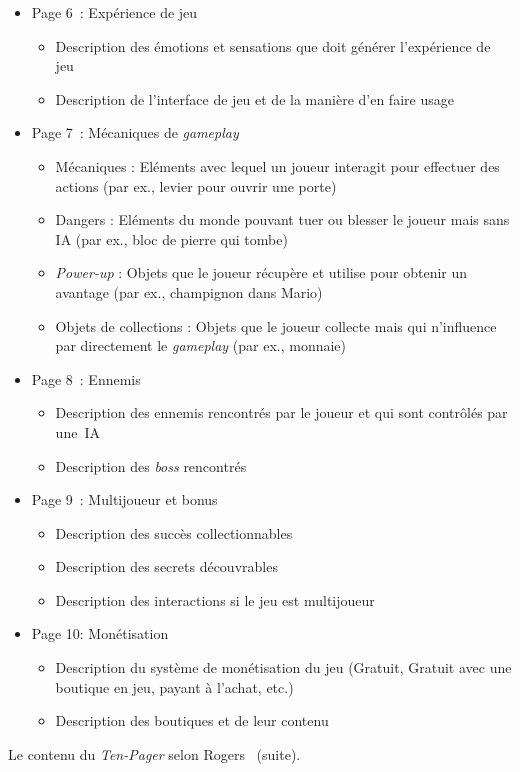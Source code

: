 \begin{table}[H]
\footnotesize
\begin{framed}
\begin{itemize}
    \item Page 6~: Expérience de jeu
    \begin{itemize}
        \item Description des émotions et sensations que doit générer l'expérience de jeu
        \item Description de l'interface de jeu et de la manière d'en faire usage


    \end{itemize}
    \item Page 7~:  Mécaniques de \emph{gameplay}
    \begin{itemize}
        \item Mécaniques : Eléments avec lequel un joueur interagit pour effectuer des actions (par ex., levier pour ouvrir une porte)
        \item Dangers : Eléments du monde pouvant tuer ou blesser le joueur mais sans IA (par ex., bloc de pierre qui tombe)
        \item \emph{Power-up} : Objets que le joueur récupère et utilise pour obtenir un avantage (par ex., champignon dans Mario)
        \item Objets de collections : Objets que le joueur collecte mais qui n'influence par directement le \emph{gameplay} (par ex.,  monnaie)
    \end{itemize}
    \item Page 8~: Ennemis
    \begin{itemize}
        \item Description des ennemis rencontrés par le joueur et qui sont contrôlés par une~IA
        \item Description des \emph{boss} rencontrés
    \end{itemize}
    \item Page 9~: Multijoueur et bonus
    \begin{itemize}
        \item Description des succès collectionnables
        \item Description des secrets découvrables
        \item Description des interactions si le jeu est multijoueur
    \end{itemize}
    \item Page 10: Monétisation
    \begin{itemize}
        \item Description du système de monétisation du jeu (Gratuit, Gratuit avec une boutique en jeu, payant à l'achat, etc.)
        \item Description des boutiques et de leur contenu
    \end{itemize}
\end{itemize}
\end{framed}
\caption{Le contenu du \emph{Ten-Pager} selon Rogers~\cite{LevelUpRogers2014} (suite).}
\label{Ten-Pager.table}
\end{table}





